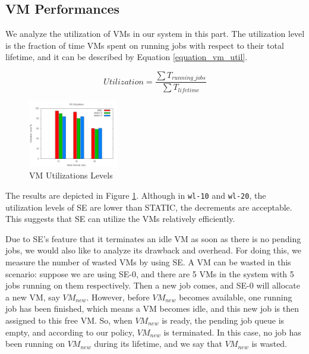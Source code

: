 \subsection{VM Performances}
We analyze the utilization of VMs in our system in this part. The
utilization level is the fraction of time VMs spent on running jobs
with respect to their total lifetime, and it can be described by
Equation \ref{equation_vm_util}.

\begin{equation}
\label{equation_vm_util}
Utilization = \frac{\sum{T_{running\_jobs}}}{\sum{T_{lifetime}}}
\end{equation}

\begin{figure}[!t]
\centering
\includegraphics[width=0.35\textwidth]{pictures/vm-util.png}
\caption{VM Utilizations Levels}
\label{figure_vm_util}
\end{figure}

The results are depicted in Figure \ref{figure_vm_util}. Although in
\texttt{wl-10} and \texttt{wl-20}, the utilization levels of SE are
lower than STATIC, the decrements are acceptable. This suggests that
SE can utilize the VMs relatively efficiently.

Due to SE's feature that it terminates an idle VM as soon as there is
no pending jobs, we would also like to analyze its drawback and
overhead. For doing this, we measure the number of wasted VMs by using
SE. A VM can be wasted in this scenario: suppose we are using SE-0,
and there are 5 VMs in the system with 5 jobs running on them
respectively. Then a new job comes, and SE-0 will allocate a new VM,
say $VM_{new}$. However, before $VM_{new}$ becomes available, one
running job has been finished, which means a VM becomes idle, and this
new job is then assigned to this free VM. So, when $VM_{new}$ is
ready, the pending job queue is empty, and according to our policy,
$VM_{new}$ is terminated. In this case, no job has been running on
$VM_{new}$ during its lifetime, and we say that $VM_{new}$ is wasted.

